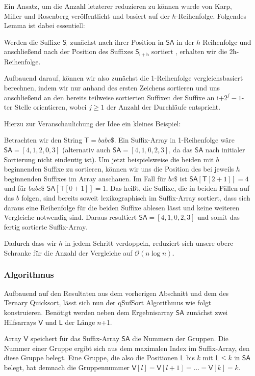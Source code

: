 Ein Ansatz, um die Anzahl letzterer reduzieren zu können wurde von Karp, Miller und Rosenberg \cite{Karp} veröffentlicht und basiert auf der $h$-Reihenfolge. Folgendes Lemma ist dabei essentiell:
\begin{lemma}
\label{manmyers}
Werden die Suffixe $\mathsf{S_i}$ zunächst nach ihrer Position in $\mathsf{SA}$ in der $h$-Reihenfolge und anschließend nach der Position des Suffixes $\mathsf{S_{i+h}}$ sortiert , erhalten wir die 2h-Reihenfolge.
\end{lemma}
Aufbauend darauf, können wir also zunächst die 1-Reihenfolge vergleichsbasiert berechnen, indem wir nur anhand des ersten Zeichens sortieren und uns anschließend an den bereits teilweise sortierten Suffixen der Suffixe an i+$2^j-1$-ter Stelle orientieren, wobei $j \geq 1$ der Anzahl der Durchläufe entspricht.

Hierzu zur Veranschaulichung der Idee ein kleines Beispiel:

Betrachten wir den String $\mathsf{T} =  babc\$ $. Ein Suffix-Array in 1-Reihenfolge wäre $\mathsf{SA}=[4,1,2,0,3]$ (alternativ auch $\mathsf{SA}=[4,1,0,2,3]$, da das $\mathsf{SA}$ nach initialer Sortierung nicht eindeutig ist). Um jetzt beispielsweise die beiden mit $ b $ beginnenden Suffixe zu sortieren, können wir uns die Position des bei jeweils $h$ beginnenden Suffixes im Array anschauen. Im Fall für $ bc\$ $  ist $\mathsf{SA}[\mathsf{T}[2+1]]=4$ und für $ babc\$ $ $\mathsf{SA}[\mathsf{T}[0+1]]=1$. Das heißt, die Suffixe, die in beiden Fällen auf das $ b $ folgen, sind bereits soweit lexikographisch im Suffix-Array sortiert, dass sich daraus eine Reihenfolge für die beiden Suffixe ablesen lässt und keine weiteren Vergleiche notwendig sind. Daraus resultiert $\mathsf{SA}=[4,1,0,2,3]$ und somit das fertig sortierte Suffix-Array.

Dadurch dass wir $h$ in jedem Schritt verdoppeln, reduziert sich unsere obere Schranke für die Anzahl der Vergleiche auf $\mathcal{O}(n\log n)$.
 \subsubsection{Algorithmus}
Aufbauend auf den Resultaten aus dem vorherigen Abschnitt und dem des Ternary Quicksort, lässt sich nun der qSufSort Algorithmus wie folgt konstruieren.
Benötigt werden neben dem Ergebnisarray $\mathsf{SA}$ zunächst zwei Hilfsarrays $\mathsf{V}$ und $\mathsf{L}$ der Länge $n$+1.

Array $\mathsf{V}$ speichert für das Suffix-Array $\mathsf{SA}$ die Nummern der Gruppen. Die Nummer einer Gruppe ergibt sich aus dem maximalen Index im Suffix-Array, den diese Gruppe belegt. Eine Gruppe, die also die Positionen $\mathsf{L}$ bis $k$ mit $\mathsf{L} \leq k$ in $\mathsf{SA}$ belegt, hat demnach die Gruppennummer $\mathsf{V}[l]=\mathsf{V}[l+1]=...=\mathsf{V}[k]=k$.

